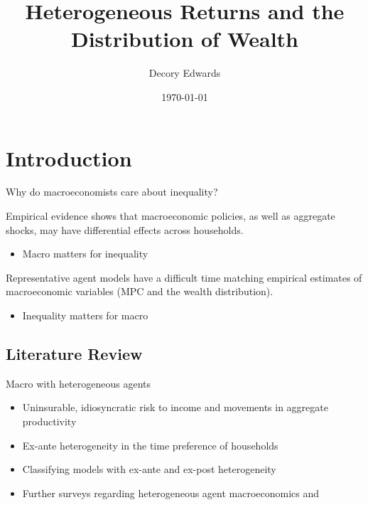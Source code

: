 \documentclass{beamer}
\title[]{Heterogeneous Returns and the Distribution of Wealth}
\author[Edwards]{Decory Edwards}
\institute[JHU]{Johns Hopkins University}
\date{\today}
\begin{document}
\begin{frame}
  \titlepage
\end{frame}

\section{Introduction}

\begin{frame}{Why do macroeconomists care about inequality?}

Empirical evidence shows that macroeconomic policies, as well as aggregate shocks, may have differential effects across households.

\begin{itemize}
\item Macro matters for inequality
\end{itemize}
\vspace{2.5mm}

Representative agent models have a difficult time matching empirical estimates of macroeconomic variables (MPC and the wealth distribution).

\begin{itemize}
\item Inequality matters for macro
\end{itemize}


\end{frame}

\subsection{Literature Review}


\begin{frame}{Macro with heterogeneous agents}

    \begin{itemize}
    \item Uninsurable, idiosyncratic risk to income and movements in aggregate productivity \parencite{ks1998} 
    \item Ex-ante heterogeneity in the time preference of households \parencite{cstw2017}
    \item Classifying models with ex-ante and ex-post heterogeneity \parencite{gkgv22}
    \item Further surveys regarding heterogeneous agent macroeconomics \parencite{Guvenen2011} and \parencite{Krueger2016} 
    \end{itemize}
    
\end{frame}
\end{document}
